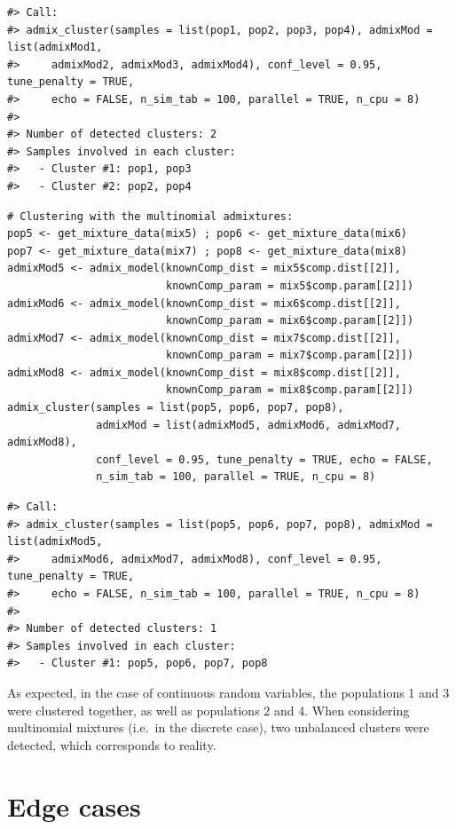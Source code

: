 \begin{verbatim}
#> Call:
#> admix_cluster(samples = list(pop1, pop2, pop3, pop4), admixMod = list(admixMod1, 
#>     admixMod2, admixMod3, admixMod4), conf_level = 0.95, tune_penalty = TRUE, 
#>     echo = FALSE, n_sim_tab = 100, parallel = TRUE, n_cpu = 8)
#> 
#> Number of detected clusters: 2 
#> Samples involved in each cluster:
#>   - Cluster #1: pop1, pop3 
#>   - Cluster #2: pop2, pop4
\end{verbatim}

\begin{verbatim}
# Clustering with the multinomial admixtures:
pop5 <- get_mixture_data(mix5) ; pop6 <- get_mixture_data(mix6)
pop7 <- get_mixture_data(mix7) ; pop8 <- get_mixture_data(mix8)
admixMod5 <- admix_model(knownComp_dist = mix5$comp.dist[[2]],
                         knownComp_param = mix5$comp.param[[2]])
admixMod6 <- admix_model(knownComp_dist = mix6$comp.dist[[2]],
                         knownComp_param = mix6$comp.param[[2]])
admixMod7 <- admix_model(knownComp_dist = mix7$comp.dist[[2]],
                         knownComp_param = mix7$comp.param[[2]])
admixMod8 <- admix_model(knownComp_dist = mix8$comp.dist[[2]],
                         knownComp_param = mix8$comp.param[[2]])
admix_cluster(samples = list(pop5, pop6, pop7, pop8), 
              admixMod = list(admixMod5, admixMod6, admixMod7, admixMod8), 
              conf_level = 0.95, tune_penalty = TRUE, echo = FALSE, 
              n_sim_tab = 100, parallel = TRUE, n_cpu = 8)
\end{verbatim}

\begin{verbatim}
#> Call:
#> admix_cluster(samples = list(pop5, pop6, pop7, pop8), admixMod = list(admixMod5, 
#>     admixMod6, admixMod7, admixMod8), conf_level = 0.95, tune_penalty = TRUE, 
#>     echo = FALSE, n_sim_tab = 100, parallel = TRUE, n_cpu = 8)
#> 
#> Number of detected clusters: 1 
#> Samples involved in each cluster:
#>   - Cluster #1: pop5, pop6, pop7, pop8
\end{verbatim}

As expected, in the case of continuous random variables, the populations 1 and 3 were clustered together, as well as populations 2 and 4. When considering multinomial mixtures (i.e.~in the discrete case), two unbalanced clusters were detected, which corresponds to reality.

\section{Edge cases}\label{edge-cases}


